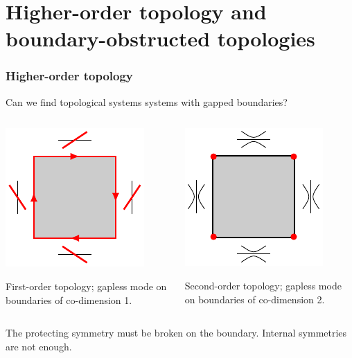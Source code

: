 \documentclass{beamer}
\renewcommand{\(}{\left(}
\renewcommand{\)}{\right)}
\renewcommand{\[}{\left[}
\renewcommand{\]}{\right]}
\begin{document}

\section{Higher-order topology and boundary-obstructed topologies}
\begin{frame}
    \frametitle{Higher-order topology}

    Can we find topological systems systems with gapped boundaries?
    \begin{columns}
        \begin{column}{0.5\textwidth}
            \begin{center}
                \includegraphics[valign=c]{first_order_boundary.pdf} 
            \end{center}
            First-order topology; gapless mode on boundaries of co-dimension 1. 
        \end{column}
        \begin{column}{0.5\textwidth}
            \begin{center}
                \includegraphics[valign=c]{second_order_surface.pdf}
            \end{center}
            Second-order topology; gapless mode on boundaries of co-dimension 2. 
        \end{column}
    \end{columns} 
    \begin{framed}
        The protecting symmetry must be broken on the boundary. Internal symmetries are not enough. 
    \end{framed}
\end{frame}
\end{document}
